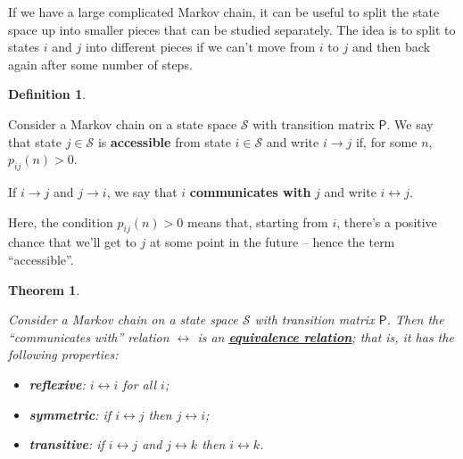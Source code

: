 \documentclass[
  a4paper,
]{article}
\providecommand{\tightlist}{%
  \setlength{\itemsep}{0pt}\setlength{\parskip}{0pt}}
\newtheorem{theorem}{Theorem}[section]
\theoremstyle{definition}
\newtheorem{definition}{Definition}[section]
\theoremstyle{definition}
\theoremstyle{definition}
\theoremstyle{remark}
\begin{document}
If we have a large complicated Markov chain, it can be useful to split the state space up into smaller pieces that can be studied separately. The idea is to split to states \(i\) and \(j\) into different pieces if we can't move from \(i\) to \(j\) and then back again after some number of steps.

\begin{definition}
\protect\hypertarget{def:comm}{}\label{def:comm}

Consider a Markov chain on a state space \(\mathcal S\) with transition matrix \(\mathsf P\). We say that state \(j\in\mathcal{S}\) is \textbf{accessible} from state \(i\in\mathcal{S}\) and write \(i \to j\) if, for some \(n\), \(p_{ij}(n)>0\).

If \(i \to j\) and \(j \to i\), we say that \(i\) \textbf{communicates with} \(j\) and write \(i \leftrightarrow j\).

\end{definition}

Here, the condition \(p_{ij}(n)>0\) means that, starting from \(i\), there's a positive chance that we'll get to \(j\) at some point in the future -- hence the term ``accessible''.

\begin{theorem}
\protect\hypertarget{thm:equiv-rel}{}\label{thm:equiv-rel}

Consider a Markov chain on a state space \(\mathcal S\) with transition matrix \(\mathsf P\). Then the ``communicates with'' relation \(\leftrightarrow\) is an \href{https://en.wikipedia.org/wiki/Equivalence_relation}{\textbf{equivalence relation}}; that is, it has the following properties:

\begin{itemize}
\tightlist
\item
  \textbf{reflexive}: \(i \leftrightarrow i\) for all \(i\);
\item
  \textbf{symmetric}: if \(i \leftrightarrow j\) then \(j \leftrightarrow i\);
\item
  \textbf{transitive}: if \(i \leftrightarrow j\) and \(j \leftrightarrow k\) then \(i \leftrightarrow k\).
\end{itemize}

\end{theorem}
\end{document}
